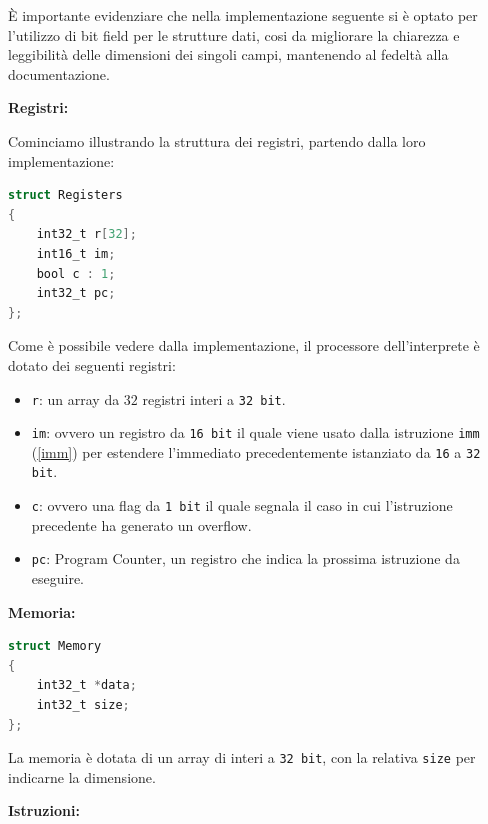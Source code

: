 È importante evidenziare che nella implementazione seguente si è optato per l'utilizzo di bit field per le strutture dati, cosi da migliorare la chiarezza e leggibilità delle dimensioni dei singoli campi, mantenendo al fedeltà alla documentazione. 

\vspace{0.6cm}

\noindent \textbf{Registri:}

\vspace{0.2cm}

\noindent Cominciamo illustrando la struttura dei registri, partendo dalla loro implementazione:
\begin{lstlisting}[language=C]
struct Registers
{
    int32_t r[32];
    int16_t im;
    bool c : 1;
    int32_t pc;
};
\end{lstlisting}
\label{structreg}

\noindent Come è possibile vedere dalla implementazione, il processore dell'interprete è dotato dei seguenti registri: 
\begin{itemize}
    \item \texttt{r}: un array da $32$ registri interi a \texttt{32 bit}.
    \item \texttt{im}: ovvero un registro da \texttt{16 bit} il quale viene usato dalla istruzione \texttt{imm} (\ref{imm}) per estendere l'immediato precedentemente istanziato da \texttt{16} a \texttt{32 bit}.
    \item \texttt{c}: ovvero una flag da \texttt{1 bit} il quale segnala il caso in cui l'istruzione precedente ha generato un overflow. 
    \item \texttt{pc}: Program Counter, un registro che indica la prossima istruzione da eseguire.
\end{itemize}    

\noindent \textbf{Memoria:}

\begin{lstlisting}[language=C]
struct Memory
{
    int32_t *data;
    int32_t size;
};
\end{lstlisting}

\vspace{0.2cm}

\noindent La memoria è dotata di un array di interi a \texttt{32 bit}, con la relativa \texttt{size} per indicarne la dimensione.

\vspace{0.5cm}

\noindent \textbf{Istruzioni:}

